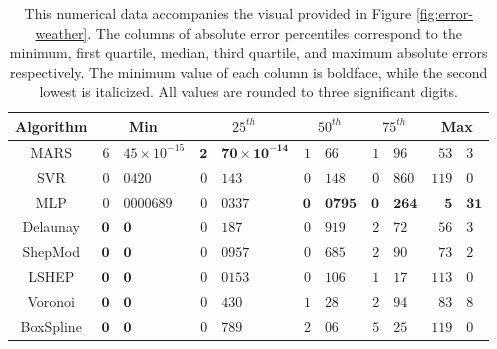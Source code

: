 \documentclass[smallextended,final]{svjour3}  %
\begin{document}
\begin{appendix}
\begin{table}
  \centering
  \begin{tabular}{c|r@{.}l|r@{.}l|r@{.}l|r@{.}l|r@{.}l}
    \hline
    Algorithm & \multicolumn{2}{c|}{Min} & \multicolumn{2}{c|}{$25^{th}$} & \multicolumn{2}{c|}{$50^{th}$} & \multicolumn{2}{c|}{$75^{th}$} & \multicolumn{2}{c}{Max}\\
    \hline
    MARS & $\mathit{6}$&$\mathit{45 \times 10^{-15}}$ & $\mathbf{2}$&$\mathbf{70 \times 10^{-14}}$ & $1$&$66$ & $1$&$96$ & $\mathit{53}$&$\mathit{3}$\\
    SVR & $0$&$0420$ & $0$&$143$ & $0$&$148$ & $\mathit{0}$&$\mathit{860}$ & $119$&$0$\\
    MLP & $0$&$0000689$ & $0$&$0337$ & $\mathbf{0}$&$\mathbf{0795}$ & $\mathbf{0}$&$\mathbf{264}$ & $\mathbf{5}$&$\mathbf{31}$\\
    Delaunay & $\mathbf{0}$&$\mathbf{0}$ & $0$&$187$ & $0$&$919$ & $2$&$72$ & $56$&$3$\\
    ShepMod & $\mathbf{0}$&$\mathbf{0}$ & $0$&$0957$ & $0$&$685$ & $2$&$90$ & $73$&$2$\\
    LSHEP & $\mathbf{0}$&$\mathbf{0}$ & $\mathit{0}$&$\mathit{0153}$ & $\mathit{0}$&$\mathit{106}$ & $1$&$17$ & $113$&$0$\\
    Voronoi & $\mathbf{0}$&$\mathbf{0}$ & $0$&$430$ & $1$&$28$ & $2$&$94$ & $83$&$8$\\
    BoxSpline & $\mathbf{0}$&$\mathbf{0}$ & $0$&$789$ & $2$&$06$ & $5$&$25$ & $119$&$0$\\
    \hline
  \end{tabular}
  \caption{This numerical data accompanies the visual provided in
    Figure \ref{fig:error-weather}. The columns of absolute error
    percentiles correspond to the minimum, first quartile, median,
    third quartile, and maximum absolute errors respectively. The
    minimum value of each column is boldface, while the second lowest
    is italicized. All values are rounded to three significant
    digits.}
  \label{table:error-weather}
\end{table}


\end{appendix}
\end{document}
